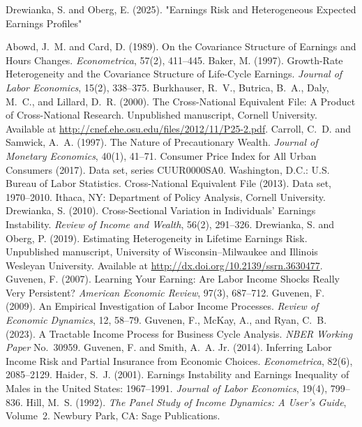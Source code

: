 \documentclass[12pt]{article}
\begin{document}
\begin{thebibliography}{99}
Drewianka, S. and Oberg, E. (2025). "Earnings Risk and Heterogeneous Expected Earnings Profiles" 

 Abowd, J.~M. and Card, D. (1989). On the Covariance Structure of Earnings and Hours Changes. \textit{Econometrica}, 57(2), 411--445.
 Baker, M. (1997). Growth-Rate Heterogeneity and the Covariance Structure of Life-Cycle Earnings. \textit{Journal of Labor Economics}, 15(2), 338--375.
 Burkhauser, R.~V., Butrica, B.~A., Daly, M.~C., and Lillard, D.~R. (2000). The Cross-National Equivalent File: A Product of Cross-National Research. Unpublished manuscript, Cornell University. Available at \url{http://cnef.ehe.osu.edu/files/2012/11/P25-2.pdf}.
 Carroll, C.~D. and Samwick, A.~A. (1997). The Nature of Precautionary Wealth. \textit{Journal of Monetary Economics}, 40(1), 41--71.
 Consumer Price Index for All Urban Consumers (2017). Data set, series CUUR0000SA0. Washington, D.C.: U.S. Bureau of Labor Statistics.
 Cross-National Equivalent File (2013). Data set, 1970--2010. Ithaca, NY: Department of Policy Analysis, Cornell University.
 Drewianka, S. (2010). Cross-Sectional Variation in Individuals’ Earnings Instability. \textit{Review of Income and Wealth}, 56(2), 291--326.
 Drewianka, S. and Oberg, P. (2019). Estimating Heterogeneity in Lifetime Earnings Risk. Unpublished manuscript, University of Wisconsin--Milwaukee and Illinois Wesleyan University. Available at \url{http://dx.doi.org/10.2139/ssrn.3630477}.
 Guvenen, F. (2007). Learning Your Earning: Are Labor Income Shocks Really Very Persistent? \textit{American Economic Review}, 97(3), 687--712.
 Guvenen, F. (2009). An Empirical Investigation of Labor Income Processes. \textit{Review of Economic Dynamics}, 12, 58--79.
 Guvenen, F., McKay, A., and Ryan, C.~B. (2023). A Tractable Income Process for Business Cycle Analysis. \textit{NBER Working Paper} No.\ 30959.
 Guvenen, F. and Smith, A.~A. Jr. (2014). Inferring Labor Income Risk and Partial Insurance from Economic Choices. \textit{Econometrica}, 82(6), 2085--2129.
 Haider, S.~J. (2001). Earnings Instability and Earnings Inequality of Males in the United States: 1967--1991. \textit{Journal of Labor Economics}, 19(4), 799--836.
 Hill, M.~S. (1992). \textit{The Panel Study of Income Dynamics: A User’s Guide}, Volume~2. Newbury Park, CA: Sage Publications.

\end{thebibliography}
\end{document}
